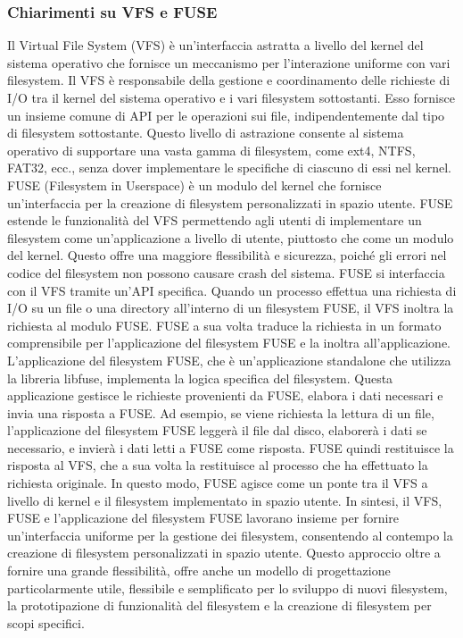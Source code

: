 \subsubsection{Chiarimenti su VFS e FUSE}
Il Virtual File System (VFS) è un’interfaccia astratta a livello del kernel del sistema operativo che fornisce un meccanismo per l’interazione uniforme con vari filesystem. Il VFS è responsabile della gestione e coordinamento delle richieste di I/O tra il kernel del sistema operativo e i vari filesystem sottostanti. Esso fornisce un insieme comune di API per le operazioni sui file, indipendentemente dal tipo di filesystem sottostante. Questo livello di astrazione consente al sistema operativo di supportare una vasta gamma di filesystem, come ext4, NTFS, FAT32, ecc., senza dover implementare le specifiche di ciascuno di essi nel kernel.
FUSE (Filesystem in Userspace) è un modulo del kernel che fornisce un’interfaccia per la creazione di filesystem personalizzati in spazio utente. FUSE estende le funzionalità del VFS permettendo agli utenti di implementare un filesystem come un’applicazione a livello di utente, piuttosto che come un modulo del kernel. Questo offre una maggiore flessibilità e sicurezza, poiché gli errori nel codice del filesystem non possono causare crash del sistema.
FUSE si interfaccia con il VFS tramite un’API specifica. Quando un processo effettua una richiesta di I/O su un file o una directory all’interno di un filesystem FUSE, il VFS inoltra la richiesta al modulo FUSE. FUSE a sua volta traduce la richiesta in un formato comprensibile per l’applicazione del filesystem FUSE e la inoltra all’applicazione.
L’applicazione del filesystem FUSE, che è un’applicazione standalone che utilizza la libreria libfuse, implementa la logica specifica del filesystem. Questa applicazione gestisce le richieste provenienti da FUSE, elabora i dati necessari e invia una risposta a FUSE. Ad esempio, se viene richiesta la lettura di un file, l’applicazione del filesystem FUSE leggerà il file dal disco, elaborerà i dati se necessario, e invierà i dati letti a FUSE come risposta.
FUSE quindi restituisce la risposta al VFS, che a sua volta la restituisce al processo che ha effettuato la richiesta originale. In questo modo, FUSE agisce come un ponte tra il VFS a livello di kernel e il filesystem implementato in spazio utente.
In sintesi, il VFS, FUSE e l’applicazione del filesystem FUSE lavorano insieme per fornire un’interfaccia uniforme per la gestione dei filesystem, consentendo al contempo la creazione di filesystem personalizzati in spazio utente. Questo approccio oltre a fornire una grande flessibilità, offre anche un modello di progettazione particolarmente utile, flessibile e semplificato per lo sviluppo di nuovi filesystem, la prototipazione di funzionalità del filesystem e la creazione di filesystem per scopi specifici.

